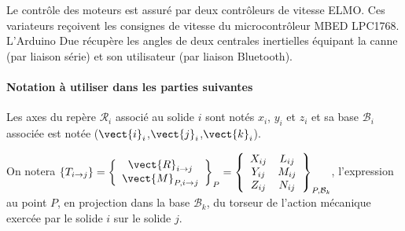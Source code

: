 Le contrôle des moteurs est assuré par deux contrôleurs de vitesse ELMO. Ces variateurs reçoivent les consignes de vitesse du microcontrôleur MBED LPC1768. L'Arduino Due récupère les angles de deux centrales inertielles équipant la canne (par liaison série) et son utilisateur (par liaison Bluetooth).

%
%

\paragraph{Notation à utiliser dans les parties suivantes} 

\noindent Les axes du repère $\mathcal{R}_i$ associé au solide $i$ sont notés $x_i$, $y_i$ et $z_i$ et sa base $\mathcal{B}_i$ associée est notée ($\vect{i}_i$,$\vect{j}_i$,$\vect{k}_i$).

On notera $\left\lbrace T_{i \rightarrow j} \right\rbrace=
\left\lbrace \begin{array}{c}
\vect{R}_{i \rightarrow j} \\
\vect{M}_{P,i \rightarrow j}
\end{array} 
\right\rbrace_{P}
=
\left\lbrace \begin{array}{cc}
X_{ij} & L_{ij} \\ 
Y_{ij} & M_{ij} \\ 
Z_{ij} & N_{ij}
\end{array} 
\right\rbrace_{P,\mathcal{B}_k}$, 
l'expression au point $P$, en projection dans la base $\mathcal {B}_k$, du torseur de l'action mécanique exercée par le solide $i$ sur le solide $j$.

